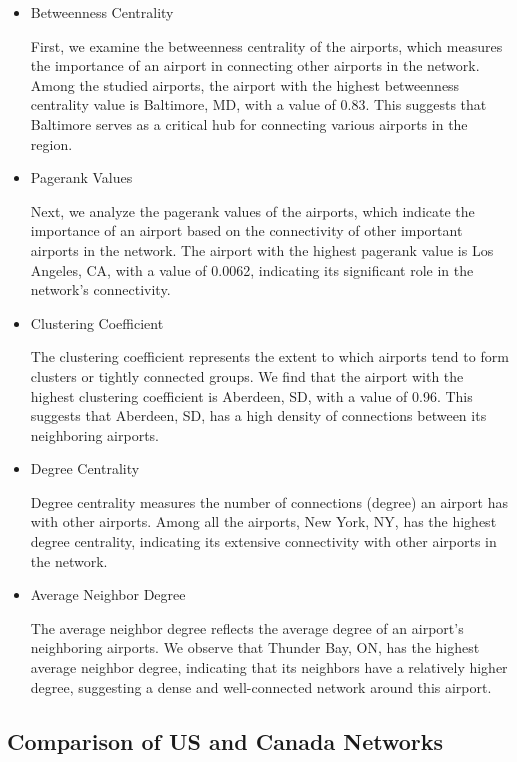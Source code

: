 \begin{itemize}
    \item{Betweenness Centrality}

    First, we examine the betweenness centrality of the airports, which measures the importance of an airport in connecting other airports in the network. Among the studied airports, the airport with the highest betweenness centrality value is Baltimore, MD, with a value of 0.83. This suggests that Baltimore serves as a critical hub for connecting various airports in the region.


    \item{Pagerank Values}
    
    Next, we analyze the pagerank values of the airports, which indicate the importance of an airport based on the connectivity of other important airports in the network. The airport with the highest pagerank value is Los Angeles, CA, with a value of 0.0062, indicating its significant role in the network's connectivity.
    
    
    \item{Clustering Coefficient}
    
    The clustering coefficient represents the extent to which airports tend to form clusters or tightly connected groups. We find that the airport with the highest clustering coefficient is Aberdeen, SD, with a value of 0.96. This suggests that Aberdeen, SD, has a high density of connections between its neighboring airports.
    
    
    \item {Degree Centrality}
    
    Degree centrality measures the number of connections (degree) an airport has with other airports. Among all the airports, New York, NY, has the highest degree centrality, indicating its extensive connectivity with other airports in the network.
    
    
    \item {Average Neighbor Degree}
    
    The average neighbor degree reflects the average degree of an airport's neighboring airports. We observe that Thunder Bay, ON, has the highest average neighbor degree, indicating that its neighbors have a relatively higher degree, suggesting a dense and well-connected network around this airport.
\end{itemize}


\subsection{Comparison of US and Canada Networks}

